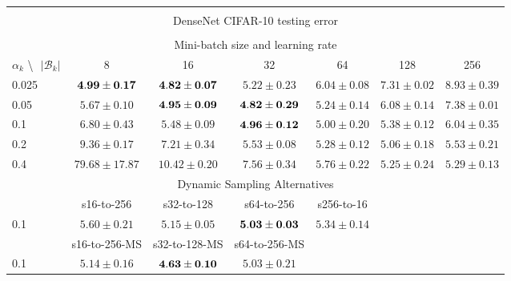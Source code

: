 \documentclass[10pt,journal,compsoc]{IEEEtran}
\begin{document}
\begin{table*}[!htbp]
\begin{center}
{\begin{tabular}{|l|c|c|c|c|c|c|}
\multicolumn{7}{|c|}{} \\
\multicolumn{7}{|c|}{DenseNet CIFAR-10 testing error} \\
\multicolumn{7}{|c|}{} \\
\hline
\multicolumn{7}{|c|}{Mini-batch size and learning rate} \\
\hline
$\alpha_k$ \textbackslash $ \text{   } {|\mathcal{B}_k|}$ & 8 & 16 & 32 & 64 & 128 & 256\\
\hline
0.025 &  $\bf 4.99\pm0.17$ & $\bf 4.82\pm0.07$ & $5.22\pm0.23$ & $6.04\pm0.08$ & $7.31\pm0.02$ & $8.93\pm0.39$  \\
\hline
0.05  & $5.67\pm0.10$ & $\bf 4.95\pm0.09$ & $\bf 4.82\pm0.29$ & $5.24\pm0.14$ & $6.08\pm0.14$ & $7.38\pm0.01$ \\
\hline
0.1   & $6.80\pm0.43$ & $5.48\pm0.09$ & $\bf 4.96\pm0.12$ & $5.00\pm0.20$ & $5.38\pm0.12$ & $6.04\pm0.35$  \\
\hline
0.2   & $9.36\pm0.17$ & $7.21\pm0.34$ & $5.53\pm0.08$ & $5.28\pm0.12$ & $5.06\pm0.18$ & $5.53\pm0.21$  \\
\hline
0.4   & $79.68\pm17.87$ & $10.42\pm0.20$ & $7.56\pm0.34$ & $5.76\pm0.22$ & $5.25\pm0.24$ & $5.29\pm0.13$  \\
\hline
\multicolumn{7}{|c|}{Dynamic Sampling Alternatives}\\
\hline
& s16-to-256  & s32-to-128 & s64-to-256 & s256-to-16 & & \\
\hline
0.1   & $5.60\pm0.21$ & $5.15\pm0.05$ & $\bf 5.03\pm0.03$ & $5.34\pm0.14$ & & \\
\hline
& s16-to-256-MS & s32-to-128-MS & s64-to-256-MS & 
& & \\
\hline
0.1 & $5.14\pm0.16$ & $\bf 4.63\pm0.10$ & $5.03\pm0.21$ & 
& & \\
\hline
\end{tabular}}
\end{center}
\end{table*}
\end{document}
